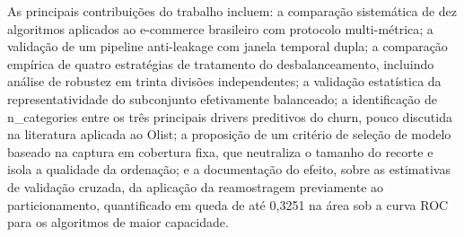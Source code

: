 As principais contribuições do trabalho incluem: a comparação sistemática de dez algoritmos aplicados ao e-commerce brasileiro com protocolo multi-métrica; a validação de um pipeline anti-leakage com janela temporal dupla; a comparação empírica de quatro estratégias de tratamento do desbalanceamento, incluindo análise de robustez em trinta divisões independentes; a validação estatística da representatividade do subconjunto efetivamente balanceado; a identificação de n\_categories entre os três principais drivers preditivos do churn, pouco discutida na literatura aplicada ao Olist; a proposição de um critério de seleção de modelo baseado na captura em cobertura fixa, que neutraliza o tamanho do recorte e isola a qualidade da ordenação; e a documentação do efeito, sobre as estimativas de validação cruzada, da aplicação da reamostragem previamente ao particionamento, quantificado em queda de até 0,3251 na área sob a curva ROC para os algoritmos de maior capacidade.

